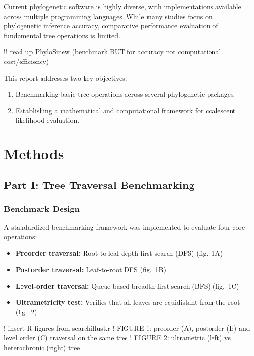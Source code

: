 \documentclass[11pt, a4paper]{article}
\begin{document}
Current phylogenetic software is highly diverse, with implementations available across multiple programming languages. While many studies focus on phylogenetic inference accuracy, comparative performance evaluation of fundamental tree operations is limited.

!! read up PhyloSmew (benchmark BUT for accuracy not computational cost/efficiency)

This report addresses two key objectives:
\begin{enumerate}
    \item Benchmarking basic tree operations across several phylogenetic packages.
    \item Establishing a mathematical and computational framework for coalescent likelihood evaluation. 
\end{enumerate}

\section{Methods}

\subsection{Part I: Tree Traversal Benchmarking}

\subsubsection{Benchmark Design}

A standardized benchmarking framework was implemented to evaluate four core operations:
\begin{itemize}
    \item \textbf{Preorder traversal:} Root-to-leaf depth-first search (DFS) (fig.~1A)
    \item \textbf{Postorder traversal:} Leaf-to-root DFS (fig.~1B)
    \item \textbf{Level-order traversal:} Queue-based breadth-first search (BFS) (fig.~1C)
    \item \textbf{Ultrametricity test:} Verifies that all leaves are equidistant
          from the root (fig.~2)
\end{itemize}

! insert R figures from searchillust.r
! FIGURE 1: preorder (A), postorder (B) and level order (C) traversal on the same tree
! FIGURE 2: ultrametric (left) vs heterochronic (right) tree
\end{document}
